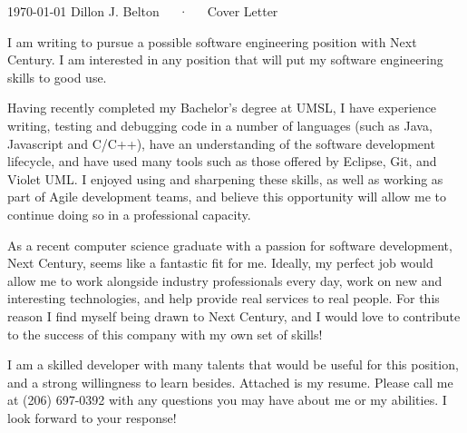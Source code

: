 \documentclass[11pt, a4paper]{awesome-cv}
\newcommand{\companyname}{Next Century}
\begin{document}
\makecvheader

\makecvfooter
  {\today}
  {Dillon J. Belton~~~·~~~Cover Letter}
  {}

\makelettertitle

\begin{cvletter}

I am writing to pursue a possible software engineering position with \companyname. I am interested in any position that will put my software engineering skills to good use.

Having recently completed my Bachelor's degree at UMSL, I have experience writing, testing and debugging code in a number of languages (such as Java, Javascript and C/C++), have an understanding of the software development lifecycle, and have used many tools such as those offered by Eclipse, Git, and Violet UML. I enjoyed using and sharpening these skills, as well as working as part of Agile development teams, and believe this opportunity will allow me to continue doing so in a professional capacity.

\lettersection{Why \companyname?}
As a recent computer science graduate with a passion for software development, \companyname, seems like a fantastic fit for me. Ideally, my perfect job would allow me to work alongside industry professionals every day, work on new and interesting technologies, and help provide real services to real people. For this reason I find myself being drawn to \companyname, and I would love to contribute to the success of this company with my own set of skills!

I am a skilled developer with many talents that would be useful for this position, and a strong willingness to learn besides.
Attached is my resume. Please call me at (206) 697-0392 with any questions you may have about me or my abilities. I look forward to your response!

\end{cvletter}


\makeletterclosing
\end{document}
